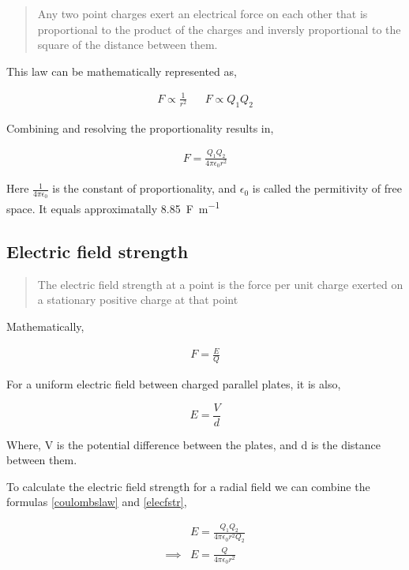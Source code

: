 \documentclass{scrbook}
\begin{document}
	\begin{quote}
		Any two point charges exert an electrical force on each other that is proportional to the product of the charges and inversly proportional to the square of the distance between them.
	\end{quote}

	This law can be mathematically represented as,

	\begin{align*}
		F \propto \frac{1}{r^2} &&
		F \propto Q_1 Q_2
	\end{align*}

	Combining and resolving the proportionality results in, 

	\begin{align} 
		F = \frac{Q_1 Q_2}{4\pi \epsilon_0 r^2 } \label{coulombslaw}
	\end{align}

	Here $\frac{1}{4\pi \epsilon_0}$ is the constant of proportionality, and $\epsilon_0$ is called the permitivity of free space. It equals approximatally \SI{8.85}{\farad\per\meter}

\subsection{Electric field strength}

	\begin{quote}
		The electric field strength at a point is the force per unit charge exerted on a stationary positive charge at that point
	\end{quote}

	Mathematically, 

	\begin{align}
		F = \frac{E}{Q} \label{elecfstr}
	\end{align}

	For a uniform electric field between charged parallel plates, it is also,

	\[ E = \frac{V}{d} \]

	Where, V is the potential difference between the plates, and d is the distance between them.

	To calculate the electric field strength for a radial field we can combine the formulas \ref{coulombslaw} and \ref{elecfstr},

	\begin{align*}
		& E = \frac{Q_1 Q_2}{4\pi \epsilon_0 r^2 Q_2} \\
		\implies &  E = \frac{Q}{4\pi \epsilon_0 r^2}
	\end{align*}
\end{document}
